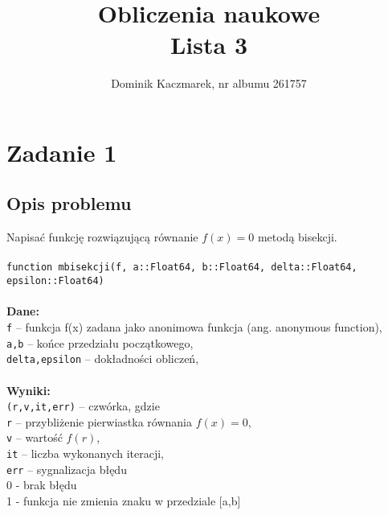 \documentclass[a4paper]{article}
\title{Obliczenia naukowe\\Lista 3}
\author{Dominik Kaczmarek, nr albumu 261757}
\newcommand\tab[1][1cm]{\hspace*{#1}}
\begin{document}
\maketitle
\tableofcontents
\newpage

\section{Zadanie 1}
    \subsection{Opis problemu}
    Napisać funkcję rozwiązującą równanie $f(x) = 0$ metodą bisekcji. \\\\
    \texttt{function mbisekcji(f, a::Float64, b::Float64, delta::Float64, epsilon::Float64)}
    \\\\
    \textbf{Dane:}\\
    \texttt{f} – funkcja f(x) zadana jako anonimowa funkcja (ang. anonymous function), \\
    \texttt{a,b} – końce przedziału początkowego, \\
    \texttt{delta,epsilon} – dokładności obliczeń, \\\\
    \textbf{Wyniki:}\\
    \texttt{(r,v,it,err)} – czwórka, gdzie \\
    \tab \texttt{r} – przybliżenie pierwiastka równania $f(x) = 0$, \\
    \tab \texttt{v} – wartość $f(r)$, \\
    \tab \texttt{it} – liczba wykonanych iteracji, \\
    \tab \texttt{err} – sygnalizacja błędu\\
    \tab \tab 0 - brak błędu\\
    \tab \tab 1 - funkcja nie zmienia znaku w przedziale [a,b]\\
    
\end{document}

